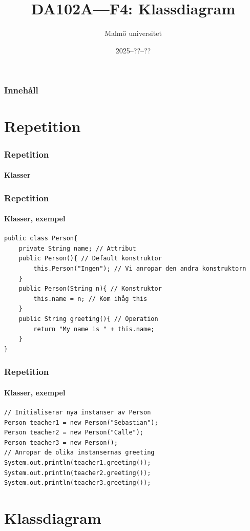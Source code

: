 \documentclass[aspectratio=169]{beamer}
\title{DA102A---F4: Klassdiagram}
\author{Malmö universitet}
\date{2025--??--??}
\institute{Institutionen för datavetenskap och medieteknik}
\begin{document}
\begin{frame}
    \frametitle{Innehåll}

    \textbox{\tableofcontents}

\end{frame}

\section{Repetition}

\begin{frame}
    \frametitle{Repetition}
    \framesubtitle{Klasser}




\end{frame}

\begin{frame}[fragile]
    \frametitle{Repetition}
    \framesubtitle{Klasser, exempel}

    \begin{lstlisting}
public class Person{
    private String name; // Attribut
    public Person(){ // Default konstruktor
        this.Person("Ingen"); // Vi anropar den andra konstruktorn
    }
    public Person(String n){ // Konstruktor
        this.name = n; // Kom ihåg this
    }
    public String greeting(){ // Operation
        return "My name is " + this.name;
    }
}
    \end{lstlisting}

\end{frame}

\begin{frame}[fragile]
    \frametitle{Repetition}
    \framesubtitle{Klasser, exempel}

    \begin{lstlisting}
// Initialiserar nya instanser av Person
Person teacher1 = new Person("Sebastian");
Person teacher2 = new Person("Calle");
Person teacher3 = new Person(); 
// Anropar de olika instansernas greeting
System.out.println(teacher1.greeting());
System.out.println(teacher2.greeting());
System.out.println(teacher3.greeting());
    \end{lstlisting}
\end{frame}

\section{Klassdiagram}
\end{document}
